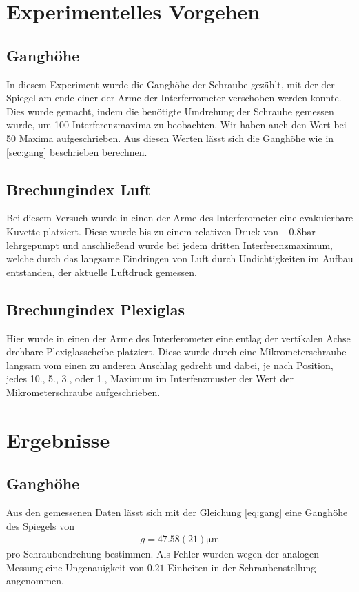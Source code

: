 \documentclass[11pt, a4paper]{article}
\begin{document}
    \section{Experimentelles Vorgehen}

    \subsection{Ganghöhe}
    In diesem Experiment wurde die Ganghöhe der Schraube gezählt, mit der der Spiegel am ende einer der Arme der Interferrometer verschoben werden konnte. Dies wurde gemacht, indem die benötigte Umdrehung der Schraube gemessen wurde, um 100 Interferenzmaxima zu beobachten. Wir haben auch den Wert bei 50 Maxima aufgeschrieben. Aus diesen Werten lässt sich die Ganghöhe wie in \ref{sec:gang} beschrieben berechnen.

    \subsection{Brechungindex Luft}
    Bei diesem Versuch wurde in einen der Arme des Interferometer eine evakuierbare Kuvette platziert. Diese wurde bis zu einem relativen Druck von $-0.8 \si{\bar} $ lehrgepumpt und anschließend wurde bei jedem dritten Interferenzmaximum, welche durch das langsame Eindringen von Luft durch Undichtigkeiten im Aufbau entstanden, der aktuelle Luftdruck gemessen.

    \subsection{Brechungindex Plexiglas}
    Hier wurde in einen der Arme des Interferometer eine entlag der vertikalen Achse drehbare Plexiglasscheibe platziert. Diese wurde durch eine Mikrometerschraube langsam vom einen zu anderen Anschlag gedreht und dabei, je nach Position, jedes 10., 5., 3., oder 1., Maximum im Interfenzmuster der Wert der Mikrometerschraube aufgeschrieben.



    \section{Ergebnisse}
    \subsection{Ganghöhe}

    Aus den gemessenen Daten lässt sich mit der Gleichung \ref{eq:gang} eine Ganghöhe des Spiegels von
    \begin{align}
        g = 47.58(21) \si{\micro\metre}
    \end{align}
    pro Schraubendrehung bestimmen. Als Fehler wurden wegen der analogen Messung eine Ungenauigkeit von $0.21$ Einheiten in der Schraubenstellung angenommen.  
    
\end{document}
